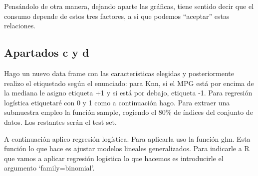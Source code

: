 \documentclass[]{article}
\newenvironment{Shaded}{\begin{snugshade}}{\end{snugshade}}
\newcommand{\KeywordTok}[1]{\textcolor[rgb]{0.13,0.29,0.53}{\textbf{{#1}}}}
\newcommand{\DataTypeTok}[1]{\textcolor[rgb]{0.13,0.29,0.53}{{#1}}}
\newcommand{\DecValTok}[1]{\textcolor[rgb]{0.00,0.00,0.81}{{#1}}}
\newcommand{\FloatTok}[1]{\textcolor[rgb]{0.00,0.00,0.81}{{#1}}}
\newcommand{\StringTok}[1]{\textcolor[rgb]{0.31,0.60,0.02}{{#1}}}
\newcommand{\NormalTok}[1]{{#1}}
\begin{document}
Pensándolo de otra manera, dejando aparte las gráficas, tiene sentido
decir que el consumo depende de estos tres factores, a si que podemos
``aceptar'' estas relaciones.

\subsection{Apartados c y d}\label{apartados-c-y-d}

Hago un nuevo data frame con las características elegidas y
posteriormente realizo el etiquetado según el enunciado: para Knn, si el
MPG está por encima de la mediana le asigno etiqueta +1 y si está por
debajo, etiqueta -1. Para regresión logística etiquetaré con 0 y 1 como
a continuación hago. Para extraer una submuestra empleo la función
sample, cogiendo el 80\% de índices del conjunto de datos. Los restantes
serán el test set.

\begin{Shaded}
\end{Shaded}

A continuación aplico regresión logística. Para aplicarla uso la función
glm. Esta función lo que hace es ajustar modelos lineales generalizados.
Para indicarle a R que vamos a aplicar regresión logística lo que
hacemos es introducirle el argumento `family=binomial'.
\end{document}
